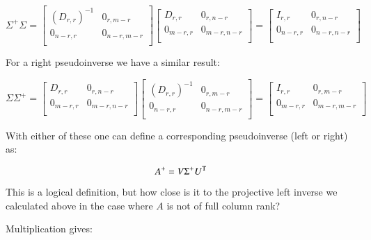 \[
\Sigma^{+} \Sigma
=
\begin{bmatrix}
(D_{r,r})^{-1} & 0_{r,m-r} \\
0_{n-r,r} & 0_{n-r,m-r} \\
\end{bmatrix}
\begin{bmatrix}
D_{r,r} & 0_{r,n-r} \\
0_{m-r,r} & 0_{m-r,n-r} \\
\end{bmatrix}
=
\begin{bmatrix}
I_{r,r} & 0_{r,n-r} \\
0_{n-r,r} & 0_{n-r,n-r} \\
\end{bmatrix}
\]

For a right pseudoinverse we have a similar result:

\[
\Sigma
\Sigma^{+}
=
\begin{bmatrix}
D_{r,r} & 0_{r,n-r} \\
0_{m-r,r} & 0_{m-r,n-r} \\
\end{bmatrix}
\begin{bmatrix}
(D_{r,r})^{-1} & 0_{r,m-r} \\
0_{n-r,r} & 0_{n-r,m-r} \\
\end{bmatrix}
=
\begin{bmatrix}
I_{r,r} & 0_{r,m-r} \\
0_{m-r,r} & 0_{m-r,m-r} \\
\end{bmatrix}
\]

With either of these one can define a corresponding pseudoinverse (left or right) as:

\begin{equation}
A^{+} = V \Sigma^{+} U^{\text{T}}
\end{equation}

This is a logical definition, but how close is it to the projective
left inverse we calculated above in the case where $A$ is not of full column 
rank?

Multiplication gives: 

